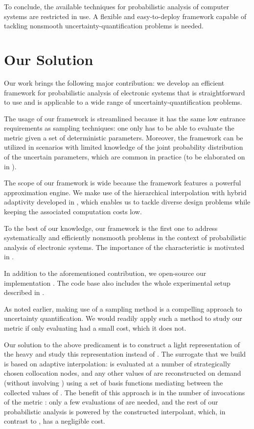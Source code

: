 To conclude, the available techniques for probabilistic analysis of computer
systems are restricted in use. A flexible and easy-to-deploy framework capable
of tackling nonsmooth uncertainty-quantification problems is needed.

\section{Our Solution}

Our work brings the following major contribution: we develop an efficient
framework for probabilistic analysis of electronic systems that is
straightforward to use and is applicable to a wide range of
uncertainty-quantification problems.

The usage of our framework is streamlined because it has the same low entrance
requirements as sampling techniques: one only has to be able to evaluate the
metric given a set of deterministic parameters. Moreover, the framework can be
utilized in scenarios with limited knowledge of the joint probability
distribution of the uncertain parameters, which are common in practice (to be
elaborated on in ).

The scope of our framework is wide because the framework features a powerful
approximation engine. We make use of the hierarchical interpolation with hybrid
adaptivity developed in \cite{jakeman2012, klimke2006, ma2009}, which enables us
to tackle diverse design problems while keeping the associated computation costs
low.

To the best of our knowledge, our framework is the first one to address
systematically and efficiently nonsmooth problems in the context of
probabilistic analysis of electronic systems. The importance of the
characteristic is motivated in .

In addition to the aforementioned contribution, we open-source our
implementation \cite{sources}. The code base also includes the whole
experimental setup described in .

As noted earlier, making use of a sampling method is a compelling approach to
uncertainty quantification. We would readily apply such a method to study our
metric \g if only evaluating \g had a small cost, which it does not.

Our solution to the above predicament is to construct a light representation of
the heavy \g and study this representation instead of \g. The surrogate that we
build is based on adaptive interpolation: \g is evaluated at a number of
strategically chosen collocation nodes, and any other values of \g are
reconstructed on demand (without involving \g) using a set of basis functions
mediating between the collected values of \g. The benefit of this approach is in
the number of invocations of the metric \g: only a few evaluations of \g are
needed, and the rest of our probabilistic analysis is powered by the constructed
interpolant, which, in contrast to \g, has a negligible cost.

